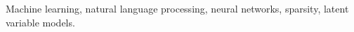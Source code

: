 \begin{keywords}
    Machine learning,
    natural language processing,
    neural networks,
    sparsity,
    latent variable models.
\end{keywords}
\clearpage
\thispagestyle{empty}
\cleardoublepage
